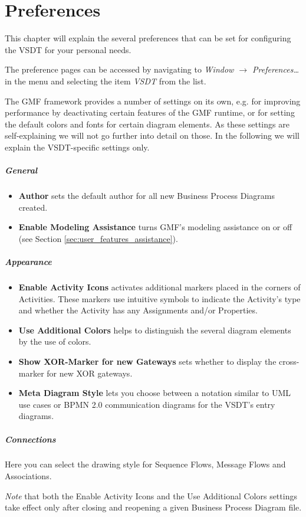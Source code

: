 \chapter{Preferences}
\label{sec:user_preferences}

This chapter will explain the several preferences that can be set for configuring
the VSDT for your personal needs.

The preference pages can be accessed by navigating to \emph{Window $\rightarrow$
Preferences\dots} in the menu and selecting the item \emph{VSDT} from the list.

The GMF framework provides a number of settings on its own, e.g. for improving
performance by deactivating certain features of the GMF runtime, or for setting
the default colors and fonts for certain diagram elements.  As these settings are
self-explaining we will not go further into detail on those.  In the following we
will explain the VSDT-specific settings only.

\paragraph{General}
\begin{itemize}
	\item \textbf{Author} sets the default author for all new Business Process
	Diagrams created.
	
	\item \textbf{Enable Modeling Assistance} turns GMF's modeling assistance on
	or off (see Section \ref{sec:user_features_assistance}).
\end{itemize}	

\paragraph{Appearance}
\begin{itemize}
	\item \textbf{Enable Activity Icons} activates additional markers placed in
	the corners of Activities.  These markers use intuitive symbols to indicate
	the Activity's type and whether the Activity has any Assignments and/or
	Properties.
	
	\item \textbf{Use Additional Colors} helps to distinguish the several diagram
	elements by the use of colors.
	
	\item \textbf{Show XOR-Marker for new Gateways} sets whether to display the
	cross-marker for new XOR gateways.
	
	\item \textbf{Meta Diagram Style} lets you choose between a notation similar
	to UML use cases or BPMN 2.0 communication diagrams for the VSDT's entry
	diagrams.
\end{itemize}

\paragraph{Connections}
Here you can select the drawing style for Sequence Flows, Message Flows and
Associations.

\emph{Note} that both the Enable Activity Icons and the Use Additional Colors
settings take effect only after closing and reopening a given Business Process
Diagram file.

